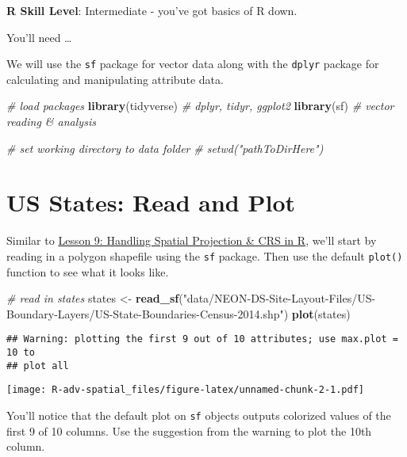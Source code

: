 \documentclass[]{book}
\newenvironment{Shaded}{\begin{snugshade}}{\end{snugshade}}
\newcommand{\KeywordTok}[1]{\textcolor[rgb]{0.13,0.29,0.53}{\textbf{{#1}}}}
\newcommand{\StringTok}[1]{\textcolor[rgb]{0.31,0.60,0.02}{{#1}}}
\newcommand{\CommentTok}[1]{\textcolor[rgb]{0.56,0.35,0.01}{\textit{{#1}}}}
\newcommand{\NormalTok}[1]{{#1}}
\begin{document}
\textbf{R Skill Level}: Intermediate - you've got basics of R down.

You'll need \ldots{}

We will use the \texttt{sf} package for vector data along with the
\texttt{dplyr} package for calculating and manipulating attribute data.

\begin{Shaded}
\begin{Highlighting}[]
\CommentTok{# load packages}
\KeywordTok{library}\NormalTok{(tidyverse)  }\CommentTok{# dplyr, tidyr, ggplot2}
\KeywordTok{library}\NormalTok{(sf)         }\CommentTok{# vector reading & analysis}

\CommentTok{# set working directory to data folder}
\CommentTok{# setwd("pathToDirHere")}
\end{Highlighting}
\end{Shaded}

\section{US States: Read and Plot}\label{us-states-read-and-plot}

Similar to
\href{https://jsta.github.io/R-spatial-raster-vector-lesson/09-vector-when-data-dont-line-up-crs/}{Lesson
9: Handling Spatial Projection \& CRS in R}, we'll start by reading in a
polygon shapefile using the \texttt{sf} package. Then use the default
\texttt{plot()} function to see what it looks like.

\begin{Shaded}
\begin{Highlighting}[]
\CommentTok{# read in states}
\NormalTok{states <-}\StringTok{ }\KeywordTok{read_sf}\NormalTok{(}\StringTok{"data/NEON-DS-Site-Layout-Files/US-Boundary-Layers/US-State-Boundaries-Census-2014.shp"}\NormalTok{)}
\KeywordTok{plot}\NormalTok{(states)}
\end{Highlighting}
\end{Shaded}

\begin{verbatim}
## Warning: plotting the first 9 out of 10 attributes; use max.plot = 10 to
## plot all
\end{verbatim}

\texttt{[image: R-adv-spatial\_files/figure-latex/unnamed-chunk-2-1.pdf]}

You'll notice that the default plot on \texttt{sf} objects outputs
colorized values of the first 9 of 10 columns. Use the suggestion from
the warning to plot the 10th column.
\end{document}
